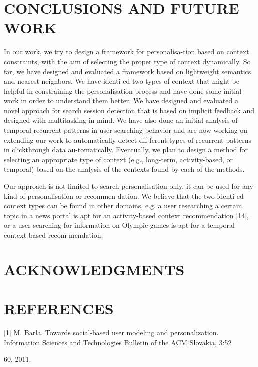 \documentclass{acm_proc_article-sp} %
\begin{document}
{\section{CONCLUSIONS AND FUTURE WORK}
In our work, we try to design a framework for personalisa-tion based on context constraints, with the aim of selecting the proper type of context dynamically. So far, we have designed and evaluated a framework based on lightweight semantics and nearest neighbors. We have identi ed two types of context that might be helpful in constraining the
personalisation process and have done some initial work in order to understand them better. We have designed and evaluated a novel approach for search session detection that is based on implicit feedback and designed with multitasking in mind. We have also done an initial analysis of temporal recurrent patterns in user searching behavior and are now working on extending our work to automatically detect dif-ferent types of recurrent patterns in clickthrough data au-tomatically. Eventually, we plan to design a method for selecting an appropriate type of context (e.g., long-term, activity-based, or temporal) based on the analysis of the contexts found by each of the methods.

Our approach is not limited to search personalisation only, it can be used for any kind of personalisation or recommen-dation. We believe that the two identi ed context types can be found in other domains, e.g. a user researching a certain topic in a news portal is apt for an activity-based context recommendation [14], or a user searching for information on Olympic games is apt for a temporal context based recom-mendation.

\section{ACKNOWLEDGMENTS}

\section{REFERENCES}
[1]	M. Barla. Towards social-based user modeling and personalization. Information Sciences and Technologies Bulletin of the ACM Slovakia, 3:52{60, 2011. 

}}
\end{document}
